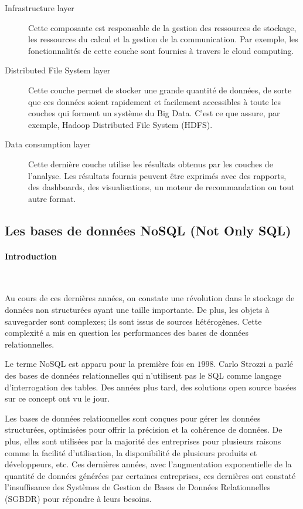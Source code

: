 \begin{description}
		\item[Infrastructure layer] Cette composante est responsable de la gestion des ressources de stockage, les ressources du calcul et la gestion de la communication. 
		Par exemple, les fonctionnalités de cette couche sont fournies à travers le cloud computing.
		
		\item[Distributed File System layer] Cette couche permet de stocker une grande quantité de données, de sorte que ces données soient rapidement et facilement accessibles à toute les couches qui forment un système du Big Data. C'est ce que assure, par exemple, Hadoop Distributed File System (HDFS).
		
		\item[Data consumption layer] Cette dernière couche utilise les résultats obtenus par les couches de l'analyse. Les résultats fournis peuvent être exprimés avec des rapports, des dashboards, des visualisations, un moteur de recommandation ou tout autre format.
		
	\end{description}
	


	
	\subsection{Les bases de données NoSQL (Not Only SQL) } \label{sec:nosql}
	
	
	\paragraph{Introduction } ~
	
    Au cours de ces dernières années, on constate une révolution dans le stockage de données non structurées ayant une taille importante.  De plus,  les objets à sauvegarder sont complexes; ils sont issus de sources hétérogènes.  Cette complexité a mis en question les performances des bases de données relationnelles. 
	
	Le terme NoSQL est apparu pour la première fois en $ 1998 $. Carlo Strozzi  a parlé des bases de données relationnelles qui n'utilisent pas le SQL comme langage d'interrogation des tables. Des années plus tard, des solutions  open source basées sur ce concept ont vu le jour. 
	
	Les bases de données relationnelles sont conçues pour gérer les données structurées, optimisées pour offrir la précision et la cohérence de données. De plus, elles sont utilisées par la majorité des entreprises pour plusieurs raisons comme   la facilité d'utilisation, la disponibilité de plusieurs produits et développeurs, etc. Ces dernières années, avec l'augmentation exponentielle de la quantité de données générées par certaines entreprises, ces dernières ont constaté l'insuffisance des Systèmes de Gestion de Bases de Données Relationnelles (SGBDR) pour répondre à leurs besoins.
	
